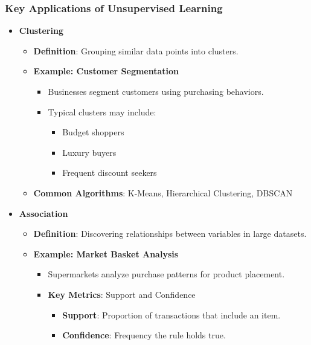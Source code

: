 \documentclass[aspectratio=169]{beamer}
\begin{document}
\begin{frame}[fragile]
    \frametitle{Key Applications of Unsupervised Learning}
    \begin{itemize}
        \item \textbf{Clustering}
        \begin{itemize}
            \item \textbf{Definition}: Grouping similar data points into clusters.
            \item \textbf{Example: Customer Segmentation}
            \begin{itemize}
                \item Businesses segment customers using purchasing behaviors.
                \item Typical clusters may include:
                \begin{itemize}
                    \item Budget shoppers
                    \item Luxury buyers
                    \item Frequent discount seekers
                \end{itemize}
            \end{itemize}
            \item \textbf{Common Algorithms}: K-Means, Hierarchical Clustering, DBSCAN
        \end{itemize}

        \item \textbf{Association}
        \begin{itemize}
            \item \textbf{Definition}: Discovering relationships between variables in large datasets.
            \item \textbf{Example: Market Basket Analysis}
            \begin{itemize}
                \item Supermarkets analyze purchase patterns for product placement.
                \item \textbf{Key Metrics}: Support and Confidence
                \begin{itemize}
                    \item \textbf{Support}: Proportion of transactions that include an item.
                    \item \textbf{Confidence}: Frequency the rule holds true.
                \end{itemize}
            \end{itemize}
        \end{itemize}
    \end{itemize}
\end{frame}
\end{document}
